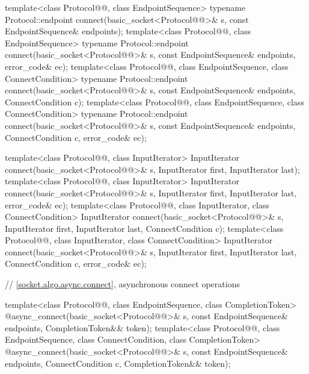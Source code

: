 \begin{codeblock}
{  template<class Protocol@@, class EndpointSequence>
    typename Protocol::endpoint connect(basic_socket<Protocol@@>& s,
                                        const EndpointSequence& endpoints);
  template<class Protocol@@, class EndpointSequence>
    typename Protocol::endpoint connect(basic_socket<Protocol@@>& s,
                                        const EndpointSequence& endpoints,
                                        error_code& ec);
  template<class Protocol@@, class EndpointSequence, class ConnectCondition>
    typename Protocol::endpoint connect(basic_socket<Protocol@@>& s,
                                        const EndpointSequence& endpoints,
                                        ConnectCondition c);
  template<class Protocol@@, class EndpointSequence, class ConnectCondition>
    typename Protocol::endpoint connect(basic_socket<Protocol@@>& s,
                                        const EndpointSequence& endpoints,
                                        ConnectCondition c,
                                        error_code& ec);

  template<class Protocol@@, class InputIterator>
    InputIterator connect(basic_socket<Protocol@@>& s,
                          InputIterator first, InputIterator last);
  template<class Protocol@@, class InputIterator>
    InputIterator connect(basic_socket<Protocol@@>& s,
                          InputIterator first, InputIterator last,
                          error_code& ec);
  template<class Protocol@@, class InputIterator, class ConnectCondition>
    InputIterator connect(basic_socket<Protocol@@>& s,
                          InputIterator first, InputIterator last,
                          ConnectCondition c);
  template<class Protocol@@, class InputIterator, class ConnectCondition>
    InputIterator connect(basic_socket<Protocol@@>& s,
                          InputIterator first, InputIterator last,
                          ConnectCondition c,
                          error_code& ec);

  // \ref{socket.algo.async.connect}, asynchronous connect operations

  template<class Protocol@@, class EndpointSequence, class CompletionToken>
    @\DEDUCED@ async_connect(basic_socket<Protocol@@>& s,
                          const EndpointSequence& endpoints,
                          CompletionToken&& token);
  template<class Protocol@@, class EndpointSequence, class ConnectCondition,
           class CompletionToken>
    @\DEDUCED@ async_connect(basic_socket<Protocol@@>& s,
                          const EndpointSequence& endpoints,
                          ConnectCondition c,
                          CompletionToken&& token);

}
\end{codeblock}
